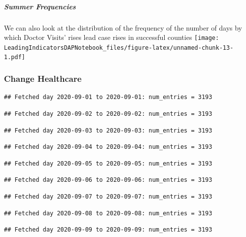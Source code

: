 \documentclass[]{article}
\let\oldsubparagraph\subparagraph
\renewcommand{\subparagraph}[1]{\oldsubparagraph{#1}\mbox{}}
\begin{document}
\hypertarget{summer-frequencies}{%
\subparagraph{Summer Frequencies}\label{summer-frequencies}}

We can also look at the distribution of the frequency of the number of
days by which Doctor Visits' rises lead case rises in successful
counties
\texttt{[image: LeadingIndicatorsDAPNotebook\_files/figure-latex/unnamed-chunk-13-1.pdf]}

\hypertarget{change-healthcare}{%
\subsubsection{Change Healthcare}\label{change-healthcare}}

\begin{verbatim}
## Fetched day 2020-09-01 to 2020-09-01: num_entries = 3193
\end{verbatim}

\begin{verbatim}
## Fetched day 2020-09-02 to 2020-09-02: num_entries = 3193
\end{verbatim}

\begin{verbatim}
## Fetched day 2020-09-03 to 2020-09-03: num_entries = 3193
\end{verbatim}

\begin{verbatim}
## Fetched day 2020-09-04 to 2020-09-04: num_entries = 3193
\end{verbatim}

\begin{verbatim}
## Fetched day 2020-09-05 to 2020-09-05: num_entries = 3193
\end{verbatim}

\begin{verbatim}
## Fetched day 2020-09-06 to 2020-09-06: num_entries = 3193
\end{verbatim}

\begin{verbatim}
## Fetched day 2020-09-07 to 2020-09-07: num_entries = 3193
\end{verbatim}

\begin{verbatim}
## Fetched day 2020-09-08 to 2020-09-08: num_entries = 3193
\end{verbatim}

\begin{verbatim}
## Fetched day 2020-09-09 to 2020-09-09: num_entries = 3193
\end{verbatim}
\end{document}
